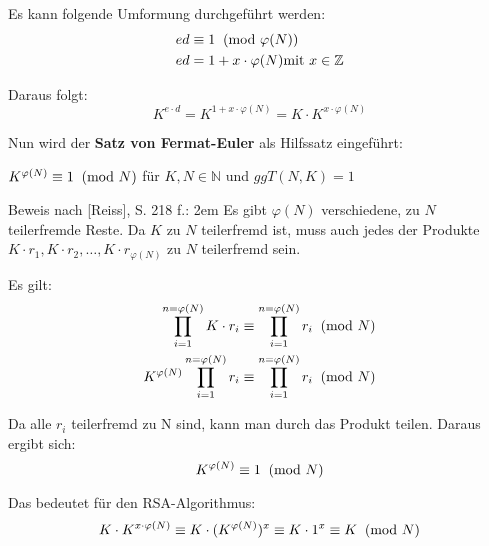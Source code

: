 Es kann folgende Umformung durchgeführt werden:
\begin{align*}
ed &\equiv 1 \imod{\varphi(N)}\\
ed &= 1 + x \cdot \varphi(N) \text{mit } x \in \mathbb{Z}
\end{align*}

Daraus folgt:
\[K^{e \cdot d} = K^{1 + x \cdot \varphi(N)} = K \cdot K^{x \cdot \varphi(N)}\]

Nun wird der \textbf{Satz von Fermat-Euler} als Hilfssatz eingeführt:
\begin{mdframed}[tikzsetting={draw=red,ultra thick}, innertopmargin=0.6cm]
$K^{\varphi(N)} \equiv 1 \imod{N}$  für $K, N \in \mathbb{N}$ und $ggT(N, K) = 1$
\end{mdframed}

Beweis nach [Reiss], S. 218 f.:
\hangindent2em
Es gibt $\varphi(N)$ verschiedene, zu $N$ teilerfremde Reste. Da $K$
zu $N$ teilerfremd ist, muss auch jedes der Produkte
$K \cdot r_1 , K \cdot r_2 , \dots, K \cdot r_{\varphi(N)}$ zu $N$
teilerfremd sein.

Es gilt:
\begin{align*}
\prod_{i=1}^{n=\varphi(N)} K \cdot r_i &\equiv \prod_{i=1}^{n=\varphi(N)} r_i \imod{N}\\
K^{\varphi(N)} \prod_{i=1}^{n=\varphi(N)} r_i &\equiv \prod_{i=1}^{n=\varphi(N)} r_i \imod{N}
\end{align*}

Da alle $r_i$ teilerfremd zu N sind, kann man durch das Produkt teilen. Daraus ergibt sich:
\[K^{\varphi(N)} \equiv 1 \imod{N}\]

Das bedeutet für den RSA-Algorithmus:
\[K \cdot K^{x \cdot \varphi(N)}  \equiv K \cdot (K^{\varphi(N)})^x \equiv K \cdot 1^x \equiv K \imod{N}\]

